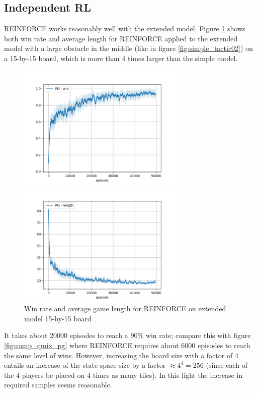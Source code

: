 \subsection{Independent RL}
REINFORCE works reasonably well with the extended model. Figure \ref{fig:pg_extended} shows both win rate and average length for REINFORCE applied to the extended model with a large obstacle in the middle (like in figure \ref{fig:simple_tactic02}) on a 15-by-15 board, which is more than 4 times larger than the simple model. 
\begin{figure}[htp]
\centering
\begin{minipage}{.45\textwidth}
  \centering
  \includegraphics[width=8cm]{images/experiment6/pg_win_15.png}
\end{minipage}%
\begin{minipage}{.05\textwidth}
\centering
  \caption*{ }
\end{minipage}%
\begin{minipage}{.45\textwidth}
  \centering
  \includegraphics[width=8cm]{images/experiment6/pg_length_15.png}
\end{minipage}
\caption{Win rate and average game length for REINFORCE on extended model 15-by-15 board}
\label{fig:pg_extended}
\end{figure}
It takes about $20000$ episodes to reach a $90\%$ win rate; compare this with figure \ref{fig:comp_qmix_pg} where REINFORCE requires about $6000$ episodes to reach the same level of wins. However, increasing the board size with a factor of $4$ entails an increase of the state-space size by a factor $\approx 4^4 = 256$ (since each of the $4$ players be placed on $4$ times as many tiles). In this light the increase in required samples seems reasonable.\\
